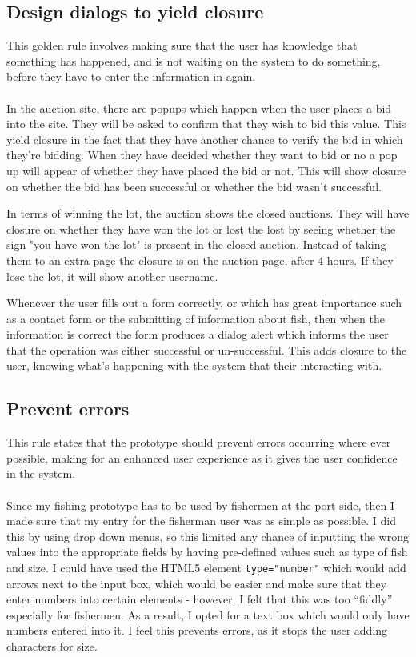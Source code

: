\documentclass{article}
\begin{document}
\subsection{Design dialogs to yield closure}
This golden rule involves making sure that the user has knowledge that something has happened, and is not waiting on the system to do something, before they have to enter the information in again.
\\ \\
In the auction site, there are popups which happen when the user places a bid into the site. They will be asked to confirm that they wish to bid this value. This yield closure in the fact that they have another chance to verify the bid in which they're bidding. When they have decided whether they want to bid or no a pop up will appear of whether they have placed the bid or not. This will show closure on whether the bid has been successful or whether the bid wasn't successful. 

In terms of winning the lot, the auction shows the closed auctions. They will have closure on whether they have won the lot or lost the lost by seeing whether the sign "you have won the lot" is present in the closed auction. Instead of taking them to an extra page the closure is on the auction page, after 4 hours. If they lose the lot, it will show another username.

Whenever the user fills out a form correctly, or which has great importance such as a contact form or the submitting of information about fish, then when the information is correct the form produces a dialog alert which informs the user that the operation was either successful or un-successful. This adds closure to the user, knowing what's happening with the system that their interacting with.
\subsection{Prevent errors}
This rule states that the prototype should prevent errors occurring where ever possible, making for an enhanced user experience as it gives the user confidence in the system. 
\\ \\
Since my fishing prototype has to be used by fishermen at the port side, then I made sure that my entry for the fisherman user was as simple as possible. I did this by using drop down menus, so this limited any chance of inputting the wrong values into the appropriate fields by having pre-defined values such as type of fish and size. I could have used the HTML5 element \verb|type="number"| which would add arrows next to the input box, which would be easier and make sure that they enter numbers into certain elements - however, I felt that this was too ``fiddly'' especially for fishermen. As a result, I opted for a text box which would only have numbers entered into it. I feel this prevents errors, as it stops the user adding characters for size. 
\end{document}
